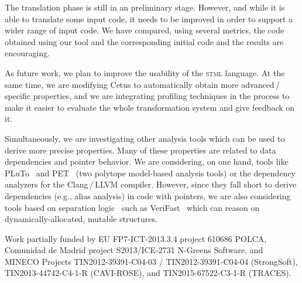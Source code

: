 \documentclass[svgnames,usenames,preprint,nocopyrightspace]{sigplanconf}
\newcommand{\stml}{\textsc{stml}\xspace}
\begin{document}
The translation phase is still in an preliminary stage. However, and
while it is able to translate some input code, it needs to be improved
in order to support a wider range of input code.  
We have compared, using several metrics, the code obtained using our
tool and the corresponding initial code and the results are
encouraging. 


As future work, we plan to improve the usability of the \stml
language.
At the same time, we are modifying Cetus to automatically obtain more
advanced\,/\,specific properties, and we are integrating profiling
techniques in the process to make it easier to evaluate the whole
transformation system and give feedback on it.

Simultaneously, we are investigating other analysis tools which can
be used to derive more precise properties.  Many of these
properties are related to data dependencies and pointer behavior.  We
are considering, on one hand, tools like
PLuTo~\cite{Bondhugula:2008} and PET~\cite{poly_pet} (two polytope
model-based analysis tools) or the dependency analyzers for the
Clang\,/\,LLVM compiler.  However, since they fall short to derive
dependencies (e.g., alias analysis) in code with pointers, we are also
considering tools based on separation
logic~\cite{DBLP:conf/csl/OHearnRY01,DBLP:conf/lics/Reynolds02} such
as VeriFast~\cite{Jacobs08theverifast,DBLP:conf/nfm/JacobsSPVPP11}
which can reason on dynamically-allocated, mutable structures.






\acks

Work partially funded by EU FP7-ICT-2013.3.4 project 610686 POLCA, Comunidad de Madrid project S2013/ICE-2731 N-Greens Software, and MINECO Projects TIN2012-39391-C04-03 / TIN2012-39391-C04-04 (StrongSoft), TIN2013-44742-C4-1-R (CAVI-ROSE), and TIN2015-67522-C3-1-R (TRACES).




\softraggedright

\end{document}
